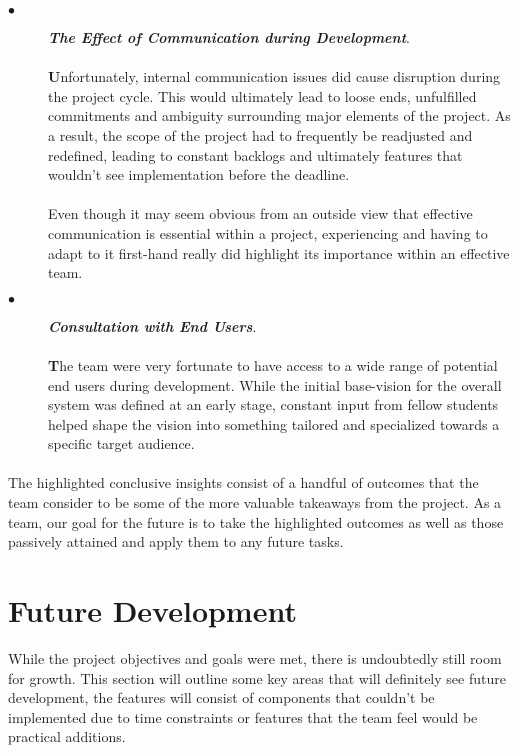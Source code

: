 \begin{description}
  \item[$\bullet$] \textit{\textbf{The Effect of Communication during Development}}.
  
  \paragraph{}
  \textbf{U}nfortunately, internal communication issues did cause disruption during the project cycle. This would ultimately lead to loose ends, unfulfilled commitments and ambiguity surrounding major elements of the project. As a result, the scope of the project had to frequently be readjusted and redefined, leading to constant backlogs and ultimately features that wouldn't see implementation before the deadline. 
  
  \paragraph{}
  Even though it may seem obvious from an outside view that effective communication is essential within a project, experiencing and having to adapt to it first-hand really did highlight its importance within an effective team. 
  
  \item[$\bullet$] \textit{\textbf{Consultation with End Users}}.
  
  \paragraph{}
  \textbf{T}he team were very fortunate to have access to a wide range of potential end users during development. While the initial base-vision for the overall system was defined at an early stage, constant input from fellow students helped shape the vision into something tailored and specialized towards a specific target audience.
\end{description}

\paragraph{}
The highlighted conclusive insights consist of a handful of outcomes that the team consider to be some of the more valuable takeaways from the project. As a team, our goal for the future is to take the highlighted outcomes as well as those passively attained and apply them to any future tasks.

\section{Future Development}
While the project objectives and goals were met, there is undoubtedly still room for growth. This section will outline some key areas that will definitely see future development, the features will consist of components that couldn't be implemented due to time constraints or features that the team feel would be practical additions.

